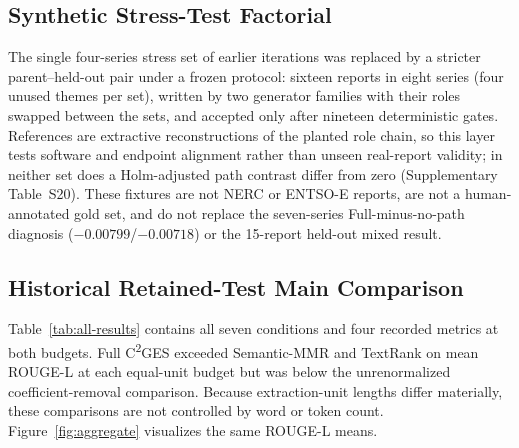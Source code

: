 \documentclass[information,article,submit,moreauthors]{Definitions/mdpi}
\newcommand{\cges}{C\textsuperscript{2}GES}
\begin{document}
\subsection{Synthetic Stress-Test Factorial}

The single four-series stress set of earlier iterations was replaced by a stricter parent--held-out pair under a frozen protocol: sixteen reports in eight series (four unused themes per set), written by two generator families with their roles swapped between the sets, and accepted only after nineteen deterministic gates. References are extractive reconstructions of the planted role chain, so this layer tests software and endpoint alignment rather than unseen real-report validity; in neither set does a Holm-adjusted path contrast differ from zero (Supplementary Table~S20). These fixtures are not NERC or ENTSO-E reports, are not a human-annotated gold set, and do not replace the seven-series Full-minus-no-path diagnosis ($-0.00799$/$-0.00718$) or the 15-report held-out mixed result.


\subsection{Historical Retained-Test Main Comparison}

Table~\ref{tab:all-results} contains all seven conditions and four recorded metrics at both budgets. Full \cges{} exceeded Semantic-MMR and TextRank on mean ROUGE-L at each equal-unit budget but was below the unrenormalized coefficient-removal comparison. Because extraction-unit lengths differ materially, these comparisons are not controlled by word or token count. Figure~\ref{fig:aggregate} visualizes the same ROUGE-L means.
\end{document}
